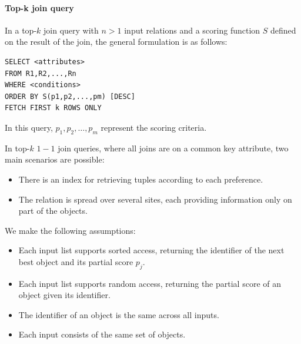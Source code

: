 \paragraph*{Top-k join query}
In a top-$k$ join query with $n>1$ input relations and a scoring function $S$ defined on the result of the join, the general formulation is as follows:
\begin{lstlisting}[style=SQL]
SELECT <attributes>
FROM R1,R2,...,Rn
WHERE <conditions>
ORDER BY S(p1,p2,...,pm) [DESC]
FETCH FIRST k ROWS ONLY             
\end{lstlisting}
In this query, $p_1, p_2, \dots, p_m$ represent the scoring criteria.

In top-$k$ $1-1$ join queries, where all joins are on a common key attribute, two main scenarios are possible:
\begin{itemize}
    \item There is an index for retrieving tuples according to each preference.
    \item The relation is spread over several sites, each providing information only on part of the objects.
\end{itemize}
We make the following assumptions: 
\begin{itemize}
    \item Each input list supports sorted access, returning the identifier of the next best object and its partial score $p_j$.
    \item Each input list supports random access, returning the partial score of an object given its identifier.
    \item The identifier of an object is the same across all inputs.
    \item Each input consists of the same set of objects.
\end{itemize}
